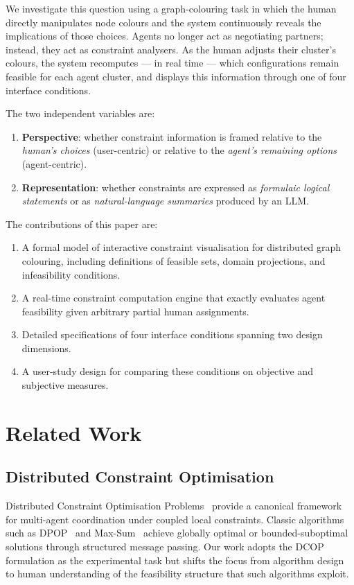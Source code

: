 \documentclass[10pt]{article}
\theoremstyle{definition}
\begin{document}
We investigate this question using a graph-colouring task in which the human directly manipulates
node colours and the system continuously reveals the implications of those choices.  Agents no
longer act as negotiating partners; instead, they act as constraint analysers.  As the human
adjusts their cluster's colours, the system recomputes --- in real time --- which configurations
remain feasible for each agent cluster, and displays this information through one of four
interface conditions.

The two independent variables are:
\begin{enumerate}
  \item \textbf{Perspective}: whether constraint information is framed relative to the
        \emph{human's choices} (user-centric) or relative to the \emph{agent's remaining options}
        (agent-centric).
  \item \textbf{Representation}: whether constraints are expressed as \emph{formulaic logical
        statements} or as \emph{natural-language summaries} produced by an LLM.
\end{enumerate}

The contributions of this paper are:
\begin{enumerate}
  \item A formal model of interactive constraint visualisation for distributed graph colouring,
        including definitions of feasible sets, domain projections, and infeasibility conditions.
  \item A real-time constraint computation engine that exactly evaluates agent feasibility given
        arbitrary partial human assignments.
  \item Detailed specifications of four interface conditions spanning two design dimensions.
  \item A user-study design for comparing these conditions on objective and subjective measures.
\end{enumerate}

\section{Related Work}
\label{sec:related}

\subsection{Distributed Constraint Optimisation}
Distributed Constraint Optimisation Problems~\citep{modi2005adopt} provide a canonical framework
for multi-agent coordination under coupled local constraints.  Classic algorithms such as
DPOP~\citep{petcu2005dpop} and Max-Sum~\citep{rogers2011bounded} achieve globally optimal or
bounded-suboptimal solutions through structured message passing.  Our work adopts the DCOP
formulation as the experimental task but shifts the focus from algorithm design to human
understanding of the feasibility structure that such algorithms exploit.
\end{document}
